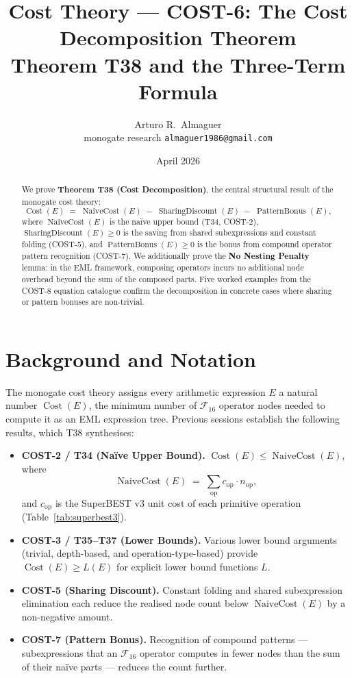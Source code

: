 \documentclass[12pt,a4paper]{article}
\title{Cost Theory --- COST-6: The Cost Decomposition Theorem\\[4pt]
       \large Theorem T38 and the Three-Term Formula}
\author{Arturo R.\ Almaguer\\
\small monogate research \quad \texttt{almaguer1986@gmail.com}}
\date{April 2026}
\theoremstyle{definition}
\newcommand{\Cost}{\operatorname{Cost}}
\newcommand{\NC}{\operatorname{NaiveCost}}
\newcommand{\SD}{\operatorname{SharingDiscount}}
\newcommand{\PB}{\operatorname{PatternBonus}}
\begin{document}
\maketitle

\begin{abstract}
We prove \textbf{Theorem T38 (Cost Decomposition)}, the central structural
result of the monogate cost theory:
\[
  \Cost(E) \;=\; \NC(E) \;-\; \SD(E) \;-\; \PB(E),
\]
where $\NC(E)$ is the na\"{i}ve upper bound (T34, COST-2), $\SD(E) \geq 0$
is the saving from shared subexpressions and constant folding (COST-5), and
$\PB(E) \geq 0$ is the bonus from compound operator pattern recognition
(COST-7).  We additionally prove the \textbf{No Nesting Penalty} lemma:
in the EML framework, composing operators incurs no additional node overhead
beyond the sum of the composed parts.  Five worked examples from the COST-8
equation catalogue confirm the decomposition in concrete cases where sharing
or pattern bonuses are non-trivial.
\end{abstract}

\tableofcontents
\bigskip

\section{Background and Notation}
\label{sec:background}

The monogate cost theory assigns every arithmetic expression $E$ a natural
number $\Cost(E)$, the minimum number of $\mathcal{F}_{16}$ operator nodes
needed to compute it as an EML expression tree.
Previous sessions establish the following results, which T38 synthesises:

\begin{itemize}
  \item \textbf{COST-2 / T34 (Na\"{i}ve Upper Bound).}
        $\Cost(E) \leq \NC(E)$, where
        \[
          \NC(E) \;=\; \sum_{\mathrm{op}} c_{\mathrm{op}} \cdot n_{\mathrm{op}},
        \]
        and $c_{\mathrm{op}}$ is the SuperBEST v3 unit cost of each primitive
        operation (Table~\ref{tab:superbest3}).
  \item \textbf{COST-3 / T35--T37 (Lower Bounds).}
        Various lower bound arguments (trivial, depth-based, and
        operation-type-based) provide $\Cost(E) \geq L(E)$ for explicit
        lower bound functions $L$.
  \item \textbf{COST-5 (Sharing Discount).}
        Constant folding and shared subexpression elimination each reduce the
        realised node count below $\NC(E)$ by a non-negative amount.
  \item \textbf{COST-7 (Pattern Bonus).}
        Recognition of compound patterns --- subexpressions that an $\mathcal{F}_{16}$
        operator computes in fewer nodes than the sum of their na\"{i}ve
        parts --- reduces the count further.
\end{itemize}
\end{document}
